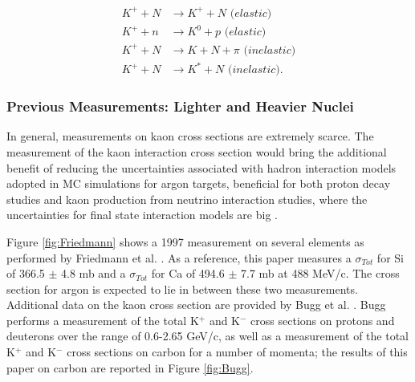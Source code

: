 \begin{align}
K^{+} + N &\rightarrow K^{+} + N\textit{ (elastic)}\\
K^{+} + n &\rightarrow K^{0} + p\textit{ (elastic)}\\
K^{+} + N &\rightarrow K + N + \pi \textit{ (inelastic)}\\
K^{+} + N &\rightarrow K^{*} + N\textit{ (inelastic)}.
\end{align}

\subsubsection{Previous Measurements: Lighter and Heavier Nuclei}
In general, measurements on kaon cross sections are  extremely scarce. The measurement of the kaon interaction cross section would bring the additional benefit of reducing the uncertainties associated  with hadron interaction models adopted in MC simulations for argon targets, beneficial for both proton decay studies and kaon production from neutrino interaction studies, where the  uncertainties for final state interaction models are big \cite{Drakoulakos:2004gn}. 

Figure \ref{fig:Friedmann} shows a 1997 measurement on several elements as performed by  Friedmann et al.  \cite{Friedman:1997eq}. As a reference, this paper measures a $\sigma_{Tot}$ for Si of  366.5  $\pm$  4.8 mb and a $\sigma_{Tot}$ for Ca of 494.6  $\pm$ 7.7 mb at 488 MeV/c.  The cross section for argon is expected to lie in between these two measurements. 
Additional data on the kaon cross section are provided by Bugg et al. \cite{PhysRev.168.1466}. Bugg performs a measurement of the total 
K$^+$ and K$^-$ cross sections on protons and deuterons over the range of 0.6-2.65 GeV/c, as well as a measurement of the total K$^+$ and K$^-$  cross sections on carbon for a number of momenta; the results of this paper on carbon are reported in Figure \ref{fig:Bugg}.




